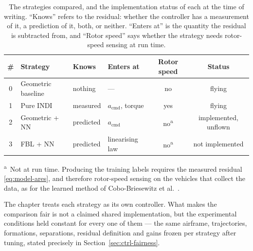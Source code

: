 \begin{table}[t]
  \centering
  \caption{The strategies compared, and the implementation status of each at the time of writing.
    ``Knows'' refers to the residual: whether the controller has a measurement of it, a prediction
    of it, both, or neither. ``Enters at'' is the quantity the residual is subtracted from, and
    ``Rotor speed'' says whether the strategy needs rotor-speed sensing at run time.}
  \label{tab:ctrl-summary}
  \small
  \begin{tabular}{@{}clllcc@{}}
    \toprule
    \# & Strategy & Knows & Enters at & Rotor speed & Status \\
    \midrule
    0 & Geometric baseline           & nothing    & ---                        & no  & flying \\
    1 & Pure INDI                    & measured   & $a_{\mathrm{cmd}}$, torque & yes & flying \\
    2 & Geometric + NN               & predicted  & $a_{\mathrm{cmd}}$         & no\textsuperscript{a}  & implemented, unflown \\
    3 & FBL + NN                     & predicted  & linearising law            & no\textsuperscript{a}  & not implemented \\
    \bottomrule
  \end{tabular}

  \vspace{0.4em}
  \begin{minipage}{0.9\linewidth}\footnotesize
    \textsuperscript{a}~Not at run time. Producing the training labels requires the measured
    residual \eqref{eq:model-ares}, and therefore rotor-speed sensing on the vehicles that collect
    the data, as for the learned method of Cobo-Briesewitz et al.~\cite{cobobriesewitz2026lindi}.
  \end{minipage}
\end{table}

The chapter treats each strategy as its own controller. What makes the comparison fair is not a
claimed shared implementation, but the experimental conditions held constant for every one of them — the same
airframe, trajectories, formations, separations, residual definition and gains frozen per strategy
after tuning, stated precisely in Section~\ref{sec:ctrl-fairness}.

